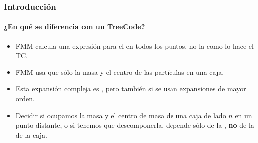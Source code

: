 \begin{frame}
    \frametitle{Introducción}
    \framesubtitle{¿En qué se diferencia con un TreeCode?}

    \begin{itemize}
        \item<1-> FMM calcula una expresión para el  en todos los puntos, no la  como lo hace el TC.
        \item<2-> FMM usa  que sólo la masa y el centro de las partículas en una caja.
        \item<2-> Esta expansión compleja es , pero también  si se usan expansiones de mayor orden.
        \item<3-> Decidir si ocupamos la masa y el centro de masa de una caja de lado $n$ en un punto distante,
                  o si tenemos que descomponerla, depende sólo de la ,
                  \textbf{no} de la  de la caja.
    \end{itemize}
\end{frame}
